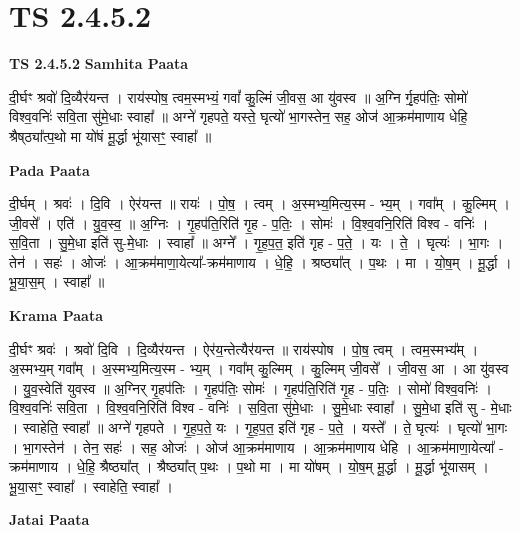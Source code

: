 \documentclass[17pt]{extarticle}
\begin{document}
\section{ TS 2.4.5.2 }

\textbf{TS 2.4.5.2 } \newline
\textbf{Samhita Paata} \newline

दी॒र्घꣳ श्रवो॑ दि॒व्यैर॑यन्त । राय॑स्पोष॒ त्वम॒स्मभ्यं॒ गवां᳚ कु॒ल्मिं जी॒वस॒ आ यु॑वस्व ॥ अ॒ग्नि र्गृ॒हप॑तिः॒ सोमो॑ विश्व॒वनिः॑ सवि॒ता सु॑मे॒धाः स्वाहा᳚ ॥ अग्ने॑ गृहपते॒ यस्ते॒ घृत्यो॑ भा॒गस्तेन॒ सह॒ ओज॑ आ॒क्रम॑माणाय धेहि॒ श्रैष्‌ठ्या᳚त्प॒थो मा यो॑षं मू॒र्द्धा भू॑यासꣳ॒॒ स्वाहा᳚ ॥ \newline

\textbf{Pada Paata} \newline

दी॒र्घम् । श्रवः॑ । दि॒वि । ऐर॑यन्त ॥ रायः॑ । पो॒ष॒ । त्वम् । अ॒स्मभ्य॒मित्य॒स्म - भ्य॒म् । गवा᳚म् । कु॒ल्मिम् । जी॒वसे᳚ । एति॑ । यु॒व॒स्व॒ ॥ अ॒ग्निः । गृ॒हप॑ति॒रिति॑ गृ॒ह - प॒तिः॒ । सोमः॑ । वि॒श्व॒वनि॒रिति॑ विश्व - वनिः॑ । स॒वि॒ता । सु॒मे॒धा इति॑ सु-मे॒धाः । स्वाहा᳚ ॥ अग्ने᳚ । गृ॒ह॒प॒त॒ इति॑ गृह - प॒ते॒ । यः । ते॒ । घृत्यः॑ । भा॒गः । तेन॑ । सहः॑ । ओजः॑ । आ॒क्रम॑माणा॒येत्या᳚-क्रम॑माणाय । धे॒हि॒ । श्रष्ठ्या᳚त् । प॒थः । मा । यो॒ष॒म् । मू॒र्द्धा । भू॒या॒स॒म् । स्वाहा᳚ ॥  \newline


\textbf{Krama Paata} \newline

दी॒र्घꣳ श्रवः॑ । श्रवो॑ दि॒वि । दि॒व्यैर॑यन्त । ऐर॑य॒न्तेत्यैर॑यन्त ॥ राय॑स्पोष । पो॒ष॒ त्वम् । त्वम॒स्मभ्य᳚म् । अ॒स्मभ्य॒म् गवा᳚म् । अ॒स्मभ्य॒मित्य॒स्म - भ्य॒म् । गवा᳚म् कु॒ल्मिम् । कु॒ल्मिम् जी॒वसे᳚ । जी॒वस॒ आ । आ यु॑वस्व । यु॒व॒स्वेति॑ युवस्व ॥ अ॒ग्निर् गृ॒हप॑तिः । गृ॒हप॑तिः॒ सोमः॑ । गृ॒हप॑ति॒रिति॑ गृ॒ह - प॒तिः॒ । सोमो॑ विश्व॒वनिः॑ । वि॒श्व॒वनिः॑ सवि॒ता । वि॒श्व॒वनि॒रिति॑ विश्व - वनिः॑ । स॒वि॒ता सु॑मे॒धाः । सु॒मे॒धाः स्वाहा᳚ । सु॒मे॒धा इति॑ सु - मे॒धाः । स्वाहेति॒ स्वाहा᳚ ॥ अग्ने॑ गृहपते । गृ॒ह॒प॒ते॒ यः । गृ॒ह॒प॒त॒ इति॑ गृह - प॒ते॒ । यस्ते᳚ । ते॒ घृत्यः॑ । घृत्यो॑ भा॒गः । 
भा॒गस्तेन॑ । तेन॒ सहः॑ । सह॒ ओजः॑ । ओज॑ आ॒क्रम॑माणाय । आ॒क्रम॑माणाय धेहि । आ॒क्रम॑माणा॒येत्या᳚ - क्रम॑माणाय । धे॒हि॒ श्रैष्ठ्या᳚त् । श्रैष्ठ्या᳚त् प॒थः । प॒थो मा । मा यो॑षम् । यो॒ष॒म् मू॒र्द्धा । मू॒र्द्धा भू॑यासम् । भू॒या॒सꣳ॒॒ स्वाहा᳚ । 
स्वाहेति॒ स्वाहा᳚ । \newline

\textbf{Jatai Paata} \newline
\end{document}
